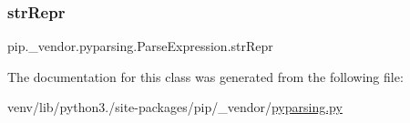 \subsubsection{\texorpdfstring{str\+Repr}{strRepr}}
{\footnotesize\ttfamily pip.\+\_\+vendor.\+pyparsing.\+Parse\+Expression.\+str\+Repr}



The documentation for this class was generated from the following file\+:\begin{DoxyCompactItemize}
\item 
venv/lib/python3./site-\/packages/pip/\+\_\+vendor/\hyperlink{pip_2__vendor_2pyparsing_8py}{pyparsing.\+py}\end{DoxyCompactItemize}
